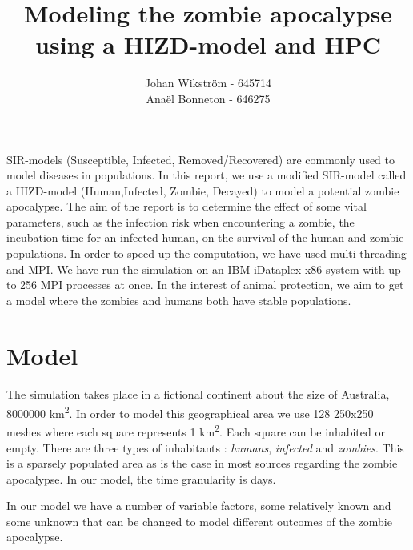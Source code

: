 \documentclass{article}
\begin{document}
\title{Modeling the zombie apocalypse using a HIZD-model and HPC}
\author{Johan Wikström - 645714 \\
        Anaël Bonneton - 646275}
\maketitle
\tableofcontents
\newpage

\paragraph{}
SIR-models (Susceptible, Infected, Removed/Recovered) are commonly used to model diseases in populations. In this report, we use a modified SIR-model called a HIZD-model (Human,Infected, Zombie, Decayed) to model a potential zombie apocalypse. The aim of the report is to determine the effect of some vital parameters, such as the infection risk when encountering a zombie, the incubation time for an infected human, on the survival of the human and zombie populations. In order to speed up the computation, we have used multi-threading and MPI\cite{openmpi}. We have run the simulation on an IBM iDataplex x86 system with up to 256 MPI processes at once. In the interest of animal protection, we aim to get a model where the zombies and humans both have stable populations.

\section{Model}

\paragraph{}
The simulation takes place in a fictional continent about the size of Australia, 8000000 km\textsuperscript{2}. In order to model this geographical area we use 128 250x250 meshes where each square represents 1 km\textsuperscript{2}. Each square can be inhabited or empty. There are three types of inhabitants : \emph{humans}, \emph{infected} and \emph{zombies}. This is a sparsely populated area as is the case in most sources regarding the zombie apocalypse\cite{zombieland}. In our model, the time granularity is days.

In our model we have a number of variable factors, some relatively known and some unknown that can be changed to model different outcomes of the zombie apocalypse.
\end{document}
